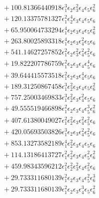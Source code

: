 \documentclass[10pt]{article}
\begin{document}
\begin{align*}
&{}  + 100.81366440918 \epsilon_{1}^{3} \epsilon_{2} \epsilon_{3}^{2} \epsilon_{4} \epsilon_{5} \epsilon_{6}^{2} \\
&{}  + 120.13375781327 \epsilon_{1}^{2} \epsilon_{2}^{4} \epsilon_{3} \epsilon_{4} \epsilon_{5} \epsilon_{6} \\
&{}  + 65.950064733294 \epsilon_{1}^{4} \epsilon_{2} \epsilon_{3} \epsilon_{4} \epsilon_{5} \epsilon_{6}^{2} \\
&{}  + 263.80025893318 \epsilon_{1}^{4} \epsilon_{2} \epsilon_{3} \epsilon_{4}^{2} \epsilon_{5} \epsilon_{6} \\
&{}  + 541.14627257852 \epsilon_{1}^{2} \epsilon_{2} \epsilon_{3}^{2} \epsilon_{4}^{2} \epsilon_{5}^{2} \epsilon_{6} \\
&{}  + 19.822207786759 \epsilon_{1}^{2} \epsilon_{2} \epsilon_{3} \epsilon_{4} \epsilon_{5}^{4} \epsilon_{6} \\
&{}  + 39.644415573518 \epsilon_{1}^{2} \epsilon_{2} \epsilon_{3} \epsilon_{4}^{4} \epsilon_{5} \epsilon_{6} \\
&{}  + 189.31250867458 \epsilon_{1}^{3} \epsilon_{2}^{2} \epsilon_{3} \epsilon_{4} \epsilon_{5} \epsilon_{6}^{2} \\
&{}  + 757.25003469833 \epsilon_{1}^{3} \epsilon_{2}^{2} \epsilon_{3} \epsilon_{4}^{2} \epsilon_{5} \epsilon_{6} \\
&{}  + 49.555519466898 \epsilon_{1}^{2} \epsilon_{2} \epsilon_{3} \epsilon_{4} \epsilon_{5}^{3} \epsilon_{6}^{2} \\
&{}  + 407.61380049027 \epsilon_{1}^{2} \epsilon_{2}^{2} \epsilon_{3} \epsilon_{4}^{2} \epsilon_{5}^{2} \epsilon_{6} \\
&{}  + 420.05693503826 \epsilon_{1}^{3} \epsilon_{2} \epsilon_{3} \epsilon_{4}^{2} \epsilon_{5}^{2} \epsilon_{6} \\
&{}  + 853.13273582189 \epsilon_{1}^{4} \epsilon_{2}^{2} \epsilon_{3} \epsilon_{4} \epsilon_{5} \epsilon_{6} \\
&{}  + 114.13186413727 \epsilon_{1}^{2} \epsilon_{2}^{2} \epsilon_{3} \epsilon_{4} \epsilon_{5}^{2} \epsilon_{6}^{2} \\
&{}  + 459.98343596212 \epsilon_{1}^{2} \epsilon_{2}^{2} \epsilon_{3}^{2} \epsilon_{4} \epsilon_{5}^{2} \epsilon_{6} \\
&{}  + 29.733311680139 \epsilon_{1}^{2} \epsilon_{2} \epsilon_{3} \epsilon_{4} \epsilon_{5}^{2} \epsilon_{6}^{3} \\
&{}  + 29.733311680139 \epsilon_{1}^{2} \epsilon_{2} \epsilon_{3} \epsilon_{4}^{3} \epsilon_{5} \epsilon_{6}^{2} \\

\end{align*}
\end{document}
